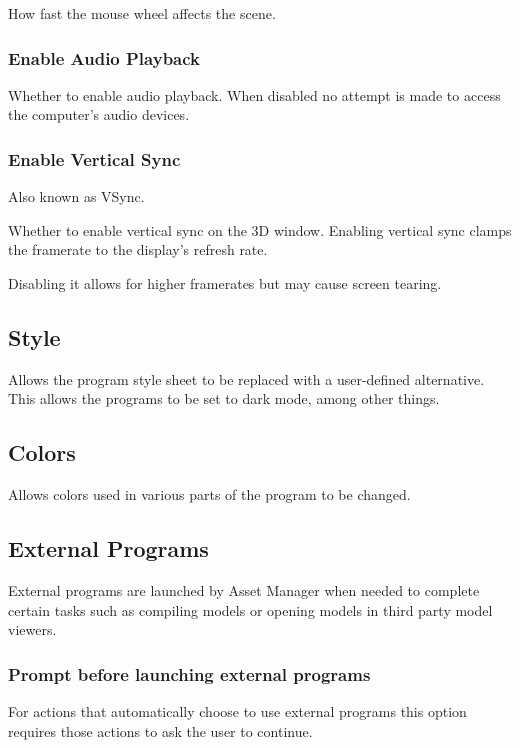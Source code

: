 \documentclass[10pt, a4paper, titlepage, oneside]{article}
\begin{document}
How fast the mouse wheel affects the scene.

\subsubsection{Enable Audio Playback}

Whether to enable audio playback. When disabled no attempt is made to access the computer's audio devices.

\subsubsection{Enable Vertical Sync}

Also known as VSync.

Whether to enable vertical sync on the 3D window. Enabling vertical sync clamps the framerate to the display's refresh rate.

Disabling it allows for higher framerates but may cause screen tearing.

\subsection{Style}

Allows the program style sheet to be replaced with a user-defined alternative. This allows the programs to be set to dark mode, among other things.

\subsection{Colors}

Allows colors used in various parts of the program to be changed.

\newpage

\subsection{External Programs}

External programs are launched by Asset Manager when needed to complete certain tasks such as compiling models or opening models in third party model viewers.

\subsubsection{Prompt before launching external programs}

For actions that automatically choose to use external programs this option requires those actions to ask the user to continue.
\end{document}
